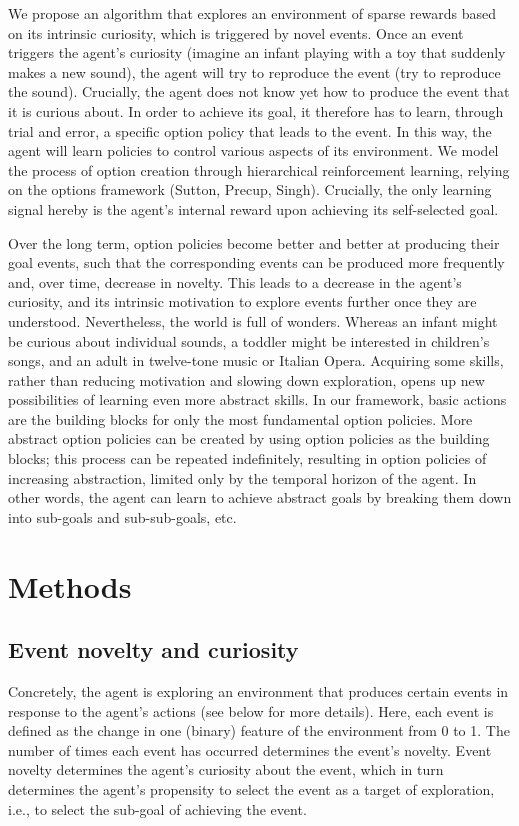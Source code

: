 \documentclass{article}
\begin{document}
We propose an algorithm that explores an environment of sparse rewards based on its intrinsic curiosity, which is triggered by novel events. Once an event triggers the agent's curiosity (imagine an infant playing with a toy that suddenly makes a new sound), the agent will try to reproduce the event (try to reproduce the sound). Crucially, the agent does not know yet how to produce the event that it is curious about. In order to achieve its goal, it therefore has to learn, through trial and error, a specific option policy that leads to the event. In this way, the agent will learn policies to control various aspects of its environment. We model the process of option creation through hierarchical reinforcement learning, relying on the options framework (Sutton, Precup, Singh). Crucially, the only learning signal hereby is the agent's internal reward upon achieving its self-selected goal.

Over the long term, option policies become better and better at producing their goal events, such that the corresponding events can be produced more frequently and, over time, decrease in novelty. This leads to a decrease in the agent's curiosity, and its intrinsic motivation to explore events further once they are understood. Nevertheless, the world is full of wonders. Whereas an infant might be curious about individual sounds, a toddler might be interested in children's songs, and an adult in twelve-tone music or Italian Opera. Acquiring some skills, rather than reducing motivation and slowing down exploration, opens up new possibilities of learning even more abstract skills. In our framework, basic actions are the building blocks for only the most fundamental option policies. More abstract option policies can be created by using option policies as the building blocks; this process can be repeated indefinitely, resulting in option policies of increasing abstraction, limited only by the temporal horizon of the agent. In other words, the agent can learn to achieve abstract goals by breaking them down into sub-goals and sub-sub-goals, etc.


\section{Methods}

\subsection{Event novelty and curiosity}

Concretely, the agent is exploring an environment that produces certain events in response to the agent's actions (see below for more details). Here, each event is defined as the change in one (binary) feature of the environment from 0 to 1. The number of times each event has occurred determines the event's novelty. Event novelty determines the agent's curiosity about the event, which in turn determines the agent's propensity to select the event as a target of exploration, i.e., to select the sub-goal of achieving the event.
\end{document}
